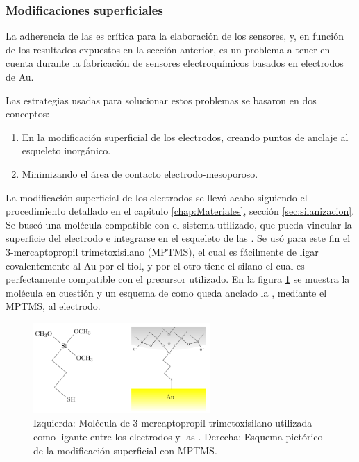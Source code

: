 		\subsubsection{Modificaciones superficiales}\label{sec:adherencia}

			La adherencia de las \pdm\space es crítica para la elaboración de los sensores, y, en función de los resultados expuestos en la sección anterior, es un problema a tener en cuenta durante la fabricación de sensores electroquímicos basados en electrodos de Au.

			Las estrategias usadas para solucionar estos problemas se basaron en dos conceptos:
				\begin{enumerate}

					\item En la modificación superficial de los electrodos, creando puntos de anclaje al esqueleto inorgánico.

					\item Minimizando el área de contacto electrodo-mesoporoso.

					\end{enumerate}
			La modificación superficial de los electrodos se llevó acabo siguiendo el procedimiento detallado en el capitulo \ref{chap:Materiales}, sección \ref{sec:silanizacion}. Se buscó una molécula compatible con el sistema utilizado, que pueda vincular la superficie del electrodo e integrarse en el esqueleto de las \pdm. Se usó para este fin el 3-mercaptopropil trimetoxisilano (MPTMS), el cual es fácilmente de ligar covalentemente al Au por el tiol\cite{Gosser}, y por el otro tiene el silano el cual es perfectamente compatible con el precursor utilizado\cite{Wu2014,Wu2013,Chen2011}. En la figura \ref{fig:mod_sup} se muestra la molécula en cuestión y un esquema de como queda anclado la \pdm\space, mediante el MPTMS, al electrodo.
			
					\begin{figure}[!ht]
							\begin{center}
							\includegraphics[width=0.60\textwidth]{Esquemas/mod_sup.pdf}
							\caption[Modificación superficial de los electrodos.]{Izquierda: Molécula de  3-mercaptopropil trimetoxisilano utilizada como ligante entre los electrodos y las \pdm. Derecha: Esquema pictórico de la modificación superficial con MPTMS.}
							\label{fig:mod_sup}
							\end{center}
							\end{figure}
			
